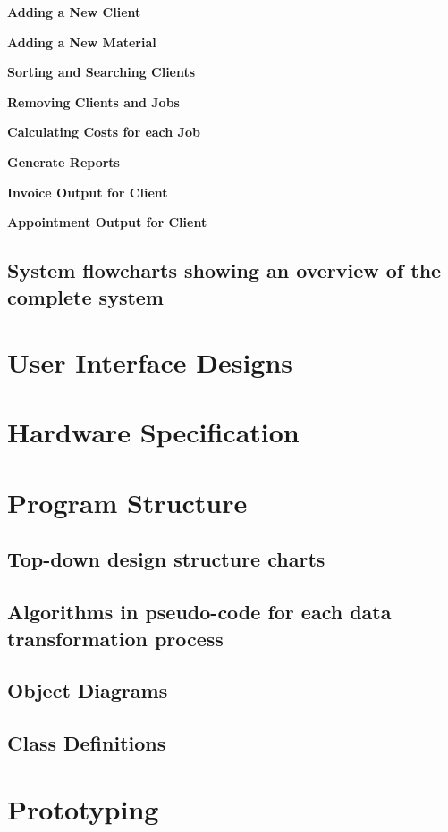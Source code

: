 \textbf{Adding a New Client}

\textbf{Adding a New Material}

\textbf{Sorting and Searching Clients}

\textbf{Removing Clients and Jobs}

\textbf{Calculating Costs for each Job}

\textbf{Generate Reports}

\textbf{Invoice Output for Client}

\textbf{Appointment Output for Client}

\subsection{System flowcharts showing an overview of the complete system}

\section{User Interface Designs}

\section{Hardware Specification}

\section{Program Structure}

\subsection{Top-down design structure charts}

\subsection{Algorithms in pseudo-code for each data transformation process}

\subsection{Object Diagrams}

\subsection{Class Definitions}

\section{Prototyping}

